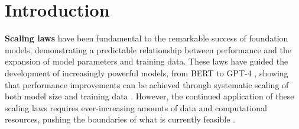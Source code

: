 
\section{Introduction}

\textbf{Scaling laws} \citep{kaplan2020scaling,hoffmann2022training} have been fundamental to the remarkable success of foundation models, demonstrating a predictable relationship between performance and the expansion of model parameters and training data. These laws have guided the development of increasingly powerful models, from BERT \citep{devlin2018bert} to GPT-4 \citep{openai2023gpt4}, showing that performance improvements can be achieved through systematic scaling of both model size and training data \citep{brown2020language,chowdhery2022palm}. However, the continued application of these scaling laws requires ever-increasing amounts of data and computational resources, pushing the boundaries of what is currently feasible \citep{patterson2021carbon}. 


